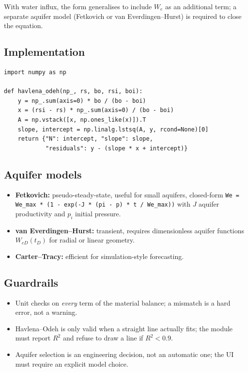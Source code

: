 \documentclass[11pt,a4paper]{article}
\newcommand{\code}[1]{\texttt{#1}}
\begin{document}
With water influx, the form generalises to include $W_e$ as an additional term;
a separate aquifer model (Fetkovich or van Everdingen--Hurst) is required to
close the equation.

\subsection{Implementation}

\begin{lstlisting}[caption={Havlena-Odeh analysis.}]
import numpy as np

def havlena_odeh(np_, rs, bo, rsi, boi):
    y = np_.sum(axis=0) * bo / (bo - boi)
    x = (rsi - rs) * np_.sum(axis=0) / (bo - boi)
    A = np.vstack([x, np.ones_like(x)]).T
    slope, intercept = np.linalg.lstsq(A, y, rcond=None)[0]
    return {"N": intercept, "slope": slope,
            "residuals": y - (slope * x + intercept)}
\end{lstlisting}

\subsection{Aquifer models}
\begin{itemize}[leftmargin=1.4em]
  \item \textbf{Fetkovich:} pseudo-steady-state, useful for small aquifers,
        closed-form \code{We = We\_max * (1 - exp(-J * (pi - p) * t / We\_max))}
        with $J$ aquifer productivity and $p_i$ initial pressure.
  \item \textbf{van Everdingen--Hurst:} transient, requires dimensionless
        aquifer functions $W_{eD}(t_D)$ for radial or linear geometry.
  \item \textbf{Carter--Tracy:} efficient for simulation-style forecasting.
\end{itemize}

\subsection{Guardrails}
\begin{itemize}[leftmargin=1.4em]
  \item Unit checks on \emph{every} term of the material balance; a mismatch is
        a hard error, not a warning.
  \item Havlena--Odeh is only valid when a straight line actually fits;
        the module must report $R^2$ and refuse to draw a line if $R^2 < 0.9$.
  \item Aquifer selection is an engineering decision, not an automatic one;
        the UI must require an explicit model choice.
\end{itemize}
\end{document}
